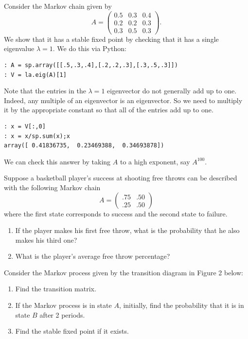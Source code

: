 Consider the Markov chain given by
\[
A = \begin{pmatrix}
0.5 & 0.3 & 0.4\\
0.2 & 0.2 & 0.3\\
0.3 & 0.5 & 0.3
\end{pmatrix}.
\]
We show that it has a stable fixed point by checking that it has a single eigenvalue $\lambda=1$.  We do this via Python:
\begin{lstlisting}[style=python]
: A = sp.array([[.5,.3,.4],[.2,.2,.3],[.3,.5,.3]])
: V = la.eig(A)[1]
\end{lstlisting}
Note that the entries in the $\lambda=1$ eigenvector do not generally add up to one.  Indeed, any multiple of an eigenvector is an eigenvector.  So we need to multiply it by the appropriate constant so that all of the entries add up to one.
\begin{lstlisting}[style=python]
: x = V[:,0]
: x = x/sp.sum(x);x
array([ 0.41836735,  0.23469388,  0.34693878])
\end{lstlisting}
We can check this answer by taking $A$ to a high exponent, say $A^{100}$.

\begin{problem}
Suppose a basketball player's success at shooting free throws can be
described with the following Markov chain
\[
A = \begin{pmatrix}.75&.50\\.25&.50\end{pmatrix}
\]
where the first state corresponds to success and the second state to failure.
\begin{enumerate}
\item If the player makes his first free throw, what is the probability that he also makes his third one?
\item What is the player's average free throw percentage?
\end{enumerate}
\end{problem}

\begin{problem}
Consider the Markov process given by the transition diagram in Figure 2 below:
\begin{enumerate}
\item Find the transition matrix.
\item If the Markov process is in state $A$, initially, find the probability that it is in state $B$ after 2 periods.
\item Find the stable fixed point if it exists.
\end{enumerate}
\end{problem}

